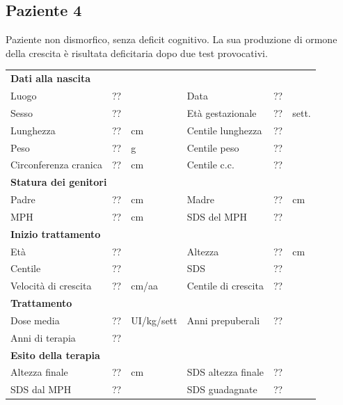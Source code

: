 \subsection*{Paziente 4}%

Paziente non dismorfico, senza deficit cognitivo. La sua produzione di ormone della crescita è risultata deficitaria dopo due test provocativi.

\begin{table}[!h]
\begin{tabular}{lrllrl}
\toprule
\multicolumn{6}{l}{\textbf{Dati alla nascita}}\\
Luogo 		& \multicolumn{2}{l}{??} 	& Data 					& \multicolumn{2}{l}{??} 	\\
Sesso 		& \multicolumn{2}{l}{??} 	& Età gestazionale 		& ?? 		& sett.\\
Lunghezza 	& ?? 		& cm 				& Centile lunghezza		& ?? 		\\
Peso 		& ?? 		& g					& Centile peso			& ?? 		\\
Circonferenza cranica	& ?? 		& cm 	& Centile c.c.			& ?? \\
\midrule
\multicolumn{6}{l}{\textbf{Statura dei genitori}}\\
Padre 		& ?? & cm 	& Madre 				& ?? & cm \\
MPH 		& ?? & cm 	& SDS del MPH 			& ??\\
\midrule
\multicolumn{6}{l}{\textbf{Inizio trattamento}} \\
Età	& ?? & 		& Altezza 				& ?? & cm  \\
Centile & ?? 	 &		& SDS		& ?? \\
Velocità di crescita & ?? & cm/aa	& Centile di crescita & ??\\
\midrule
\multicolumn{6}{l}{\textbf{Trattamento}} \\
Dose media		& ?? & UI/kg/sett & Anni prepuberali & ??\\
Anni di terapia & ??\\
\midrule
\multicolumn{6}{l}{\textbf{Esito della terapia}} \\
Altezza finale			& ?? & cm 	& SDS altezza finale		& ??\\
SDS dal MPH				& ?? &		& SDS guadagnate 			& ??\\
\bottomrule
\end{tabular}
\end{table}
\clearpage


